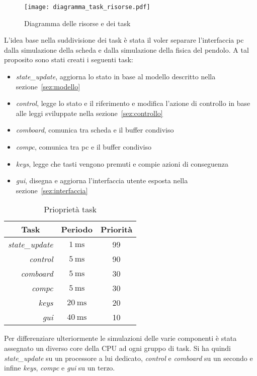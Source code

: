 
\begin{figure}[h]
	\centering
	\texttt{[image: diagramma\_task\_risorse.pdf]}
	\caption{Diagramma delle risorse e dei task}
	\label{fig:risorse_task}
\end{figure}

L'idea base nella suddivisione dei task \`e stata il voler separare l'interfaccia pc dalla simulazione della scheda e dalla simulazione della fisica del pendolo. A tal proposito sono stati creati i seguenti task:
\begin{itemize}
	\item \textit{state\_update}, aggiorna lo stato in base al modello descritto nella sezione~\ref{sez:modello}
	\item \textit{control}, legge lo stato e il riferimento e modifica l'azione di controllo in base alle leggi sviluppate nella sezione~\ref{sez:controllo}
	\item \textit{comboard}, comunica tra scheda e il buffer condiviso
	\item \textit{compc}, comunica tra pc e il buffer condiviso
	\item \textit{keys}, legge che tasti vengono premuti e compie azioni di conseguenza
	\item \textit{gui}, disegna e aggiorna l'interfaccia utente esposta nella sezione~\ref{sez:interfaccia}
\end{itemize}

\begin{table}[h]
	\centering
	\begin{tabular}{rcc}
		\multicolumn{1}{c}{Task}                & Periodo      & Priorit\`a \\ \hline
		\textit{state\_update} & $\SI{1}{\ms} $  & 99         \\
		\textit{control}      & $\SI{5}{\ms} $ & 90         \\
		\textit{comboard}     & $\SI{5}{\ms} $ & 30         \\
		\textit{compc}        & $\SI{5}{\ms} $ & 30         \\
		\textit{keys}         & $\SI{20}{\ms}$ & 20         \\
		\textit{gui}          & $\SI{40}{\ms}$ & 10         \\ 
	\end{tabular}
\caption{Priopriet\`a task}
\label{tab:info_task}
\end{table}

Per differenziare ulteriormente le simulazioni delle varie componenti \`e stata assegnato un diverso core della CPU ad ogni gruppo di task. Si ha quindi \textit{state\_update} su un processore a lui dedicato, \textit{control} e \textit{comboard} su un secondo e infine \textit{keys}, \textit{compc} e \textit{gui} su un terzo.

